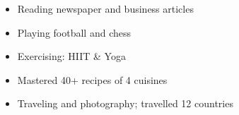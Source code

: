 %
%
%

\twocolumnsection
{
\begin{skills}
\end{skills}}
{
\vspace{1em}
\begin{itemize}
	\item Reading newspaper and business articles
	\item Playing football and chess               \item  Exercising: HIIT \& Yoga
    \item  Mastered 40+ recipes of 4 cuisines
    \item  Traveling and photography; travelled 12 countries
\end{itemize}
}